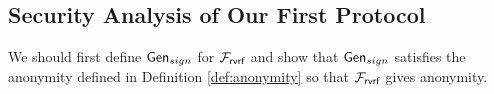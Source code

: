 %	
%	
%

\subsection{Security Analysis of Our First Protocol}

We should first define $ \mathsf{Gen}_{sign} $  for $ \mathcal{F}_{\textsf{rvrf}} $ and show that  $ \mathsf{Gen}_{sign} $ satisfies the anonymity defined in Definition \ref{def:anonymity} so that $ \mathcal{F}_{\textsf{rvrf}} $ gives anonymity. 



%	


